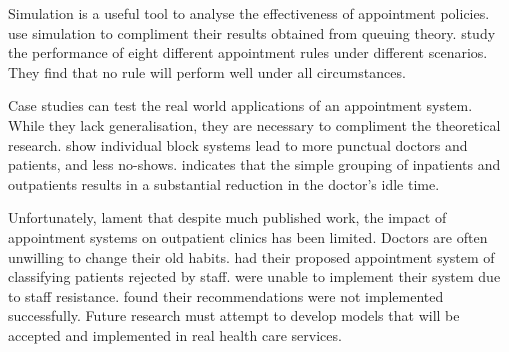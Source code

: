 Simulation is a useful tool to analyse the effectiveness of appointment policies. \citet{Kao} use simulation to compliment their results obtained from queuing theory. \citet{Ho} study the performance of eight different appointment rules under different scenarios. They find that no rule will perform well under all circumstances.

Case studies can test the real world applications of an appointment system. While they lack generalisation, they are necessary to compliment the theoretical research. \citet{Rockart} show individual block systems lead to more punctual doctors and patients, and less no-shows. \citet{Walter} indicates that the simple grouping of inpatients and outpatients results in a substantial reduction in the doctor's idle time.

Unfortunately, \citet{Cayirli} lament that despite much published work, the impact of appointment systems on outpatient clinics has been limited. Doctors are often unwilling to change their old habits. \citet{O'Keefe} had their proposed appointment system of classifying patients rejected by staff. \citet{Huarng} were unable to implement their system due to staff resistance. \citet{Bennett} found their recommendations were not implemented successfully. Future research must attempt to develop models that will be accepted and implemented in real health care services.
